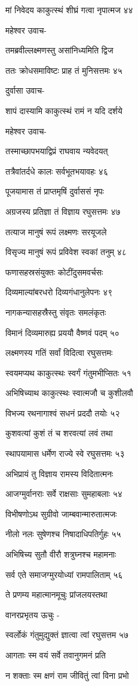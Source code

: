 मां निवेदय काकुत्स्थं शीघ्रं गत्वा नृपात्मज ४४

महेश्वर उवाच-

तमब्रवील्लक्ष्मणस्तु असांनिध्यमिति द्विज

ततः क्रोधसमाविष्टः प्राह तं मुनिसत्तमः ४५

दुर्वासा उवाच-

शापं दास्यामि काकुत्स्थं रामं न यदि दर्शये

महेश्वर उवाच-

तस्माच्छापभयाद्विप्रं राघवाय न्यवेदयत्

तत्रैवांतर्दधे कालः सर्वभूतभयावहः ४६

पूजयामास तं प्राप्तमृषिं दुर्वाससं नृपः

अग्रजस्य प्रतिज्ञा तं विज्ञाय रघुसत्तमः ४७

तत्याज मानुषं रूपं लक्ष्मणः सरयूजले

विसृज्य मानुषं रूपं प्रविवेश स्वकां तनुम् ४८

फणासहस्रसंयुक्तः कोटींदुसमवर्चसः

दिव्यमाल्यांबरधरो दिव्यगंधानुलेपनः ४९

नागकन्यासहस्रैस्तु संवृतः समलंकृतः

विमानं दिव्यमारुह्य प्रययौ वैष्णवं पदम् ५०

लक्ष्मणस्य गतिं सर्वां विदित्वा रघुसत्तमः

स्वयमप्यथ काकुत्स्थः स्वर्गं गंतुमभीप्सितः ५१

अभिषिच्याथ काकुत्स्थः स्वात्मजौ च कुशीलवौ

विभज्य रथनागाश्वं सधनं प्रददौ तयोः ५२

कुशवत्यां कुशं तं च शरवत्यां लवं तथा

स्थापयामास धर्मेण राज्ये स्वे रघुसत्तमः ५३

अभिप्रायं तु विज्ञाय रामस्य विदितात्मनः

आजग्मुर्वानराः सर्वे राक्षसाः सुमहाबलाः ५४

विभीषणोऽथ सुग्रीवो जाम्बवान्मारुतात्मजः

नीलो नलः सुषेणश्च निषादाधिपतिर्गुहः ५५

अभिषिच्य सुतौ वीरौ शत्रुघ्नश्च महामनाः

सर्व एते समाजग्मुरयोध्यां रामपालिताम् ५६

ते प्रणम्य महात्मानमूचुः प्रांजलयस्तथा

वानरप्रभृतय ऊचुः -

स्वर्लोकं गंतुमुद्युक्तं ज्ञात्वा त्वां रघुसत्तम ५७

आगताः स्म वयं सर्वे तवानुगमनं प्रति

न शक्ताः स्म क्षणं राम जीवितुं त्वां विना प्रभो

